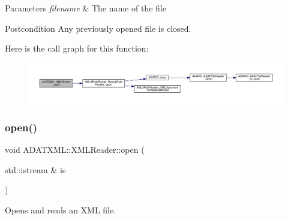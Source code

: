 \begin{DoxyParams}{Parameters}
{\em filename} & The name of the file \\
\hline
\end{DoxyParams}
\begin{DoxyPostcond}{Postcondition}
Any previously opened file is closed. 
\end{DoxyPostcond}
Here is the call graph for this function\+:
\nopagebreak
\begin{figure}[H]
\begin{center}
\leavevmode
\includegraphics[width=350pt]{db/d3f/classADATXML_1_1XMLReader_ad5dcbd08800bc67ac4a91f93cb1504b0_cgraph}
\end{center}
\end{figure}
\mbox{\label{classADATXML_1_1XMLReader_a7938cc7e08b0381e467eb7b916cbbd97}} 
\subsubsection{\texorpdfstring{open()}{open()}\hspace{0.1cm}{\footnotesize\ttfamily [4/9]}}
{\footnotesize\ttfamily void A\+D\+A\+T\+X\+M\+L\+::\+X\+M\+L\+Reader\+::open (\begin{DoxyParamCaption}\item[{std\+::istream \&}]{is }\end{DoxyParamCaption})\hspace{0.3cm}{\ttfamily [inline]}}



Opens and reads an X\+ML file. 


